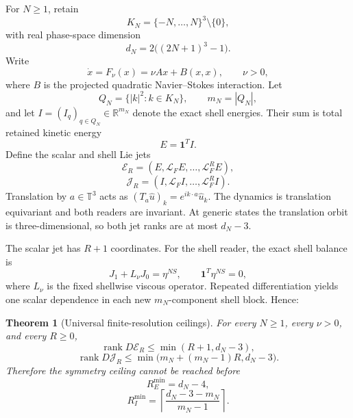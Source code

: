 \documentclass[10pt,leqno,twoside]{article}
\newcommand{\R}{\mathbb R}
\newcommand{\T}{\mathbb T}
\newcommand{\Lie}{\mathcal L}
\newcommand{\uHat}{\widehat u}
\newcommand{\ceil}[1]{\left\lceil #1\right\rceil}
\theoremstyle{plain}
\newtheorem{theorem}{Theorem}
\theoremstyle{remark}
\begin{document}
For $N\ge1$, retain
\begin{equation}
K_N=\{-N,\ldots,N\}^3\setminus\{0\},
\end{equation}
with real phase-space dimension
\begin{equation}
\boxed{d_N=2\bigl((2N+1)^3-1\bigr).}
\end{equation}
Write
\begin{equation}
\dot x=F_\nu(x)=\nu Ax+B(x,x),\qquad \nu>0,
\end{equation}
where $B$ is the projected quadratic Navier--Stokes interaction.  Let
\begin{equation}
Q_N=\{|k|^2:k\in K_N\},\qquad m_N=|Q_N|,
\end{equation}
and let $I=(I_q)_{q\in Q_N}\in\R^{m_N}$ denote the exact shell energies.  Their sum is total
retained kinetic energy
\begin{equation}
E=\mathbf1^T I.
\end{equation}
Define the scalar and shell Lie jets
\begin{equation}
\mathcal E_R=(E,\Lie_FE,\ldots,\Lie_F^R E),
\end{equation}
\begin{equation}
\mathcal J_R=(I,\Lie_FI,\ldots,\Lie_F^R I).
\end{equation}
Translation by $a\in\T^3$ acts as $(T_a\uHat)_k=e^{ik\cdot a}\uHat_k$.  The dynamics is
translation equivariant and both readers are invariant.  At generic states the translation
orbit is three-dimensional, so both jet ranks are at most $d_N-3$.

The scalar jet has $R+1$ coordinates.  For the shell reader, the exact shell balance is
\begin{equation}
J_1+L_\nu J_0=\eta^{NS},\qquad \mathbf1^T\eta^{NS}=0,
\end{equation}
where $L_\nu$ is the fixed shellwise viscous operator.  Repeated differentiation yields one
scalar dependence in each new $m_N$-component shell block.  Hence:

\begin{theorem}[Universal finite-resolution ceilings]
For every $N\ge1$, every $\nu>0$, and every $R\ge0$,
\begin{equation}
\boxed{\operatorname{rank}D\mathcal E_R\le\min(R+1,d_N-3),}
\end{equation}
\begin{equation}
\boxed{\operatorname{rank}D\mathcal J_R\le
\min\bigl(m_N+(m_N-1)R,d_N-3\bigr).}
\end{equation}
Therefore the symmetry ceiling cannot be reached before
\begin{equation}
\boxed{R_E^{\min}=d_N-4,}
\end{equation}
\begin{equation}
\boxed{R_I^{\min}=\ceil{\frac{d_N-3-m_N}{m_N-1}}.}
\end{equation}
\end{theorem}
\end{document}
